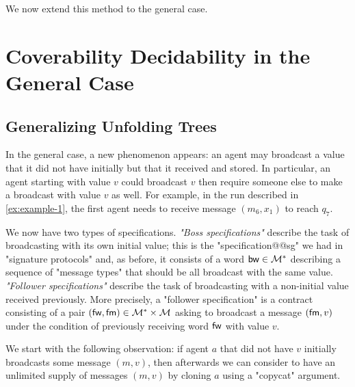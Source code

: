 We now extend this method to the general case. 


\section{Coverability Decidability in the General Case}
\label{sec:cover-general-case}

\subsection{Generalizing Unfolding Trees}
\label{sec:unfolding-trees-general}
In the general case, a new phenomenon appears: an agent may broadcast a value that it did not have initially but that it received and stored. In particular, an agent starting with value $v$ could broadcast $v$ then require someone else to make a broadcast with value $v$ as well. For example, in the run described in \cref{ex:example-1}, the first agent needs to receive message $(m_6, x_1)$ to reach $q_7$.

 We now have two types of specifications. \emph{"Boss specifications"} describe the task of broadcasting with its own initial value; this is the "specification@@sg" we had in "signature protocols" and, as before, it consists of a word $\mathsf{bw} \in \mathcal{M}^\ast$ describing a sequence of "message types" that should be all broadcast with the same value. \emph{"Follower specifications"} describe the task of broadcasting with a non-initial value received previously. More precisely, a "follower specification" is a contract consisting of a pair $(\mathsf{fw}, \mathsf{fm}) \in \mathcal{M}^*\times \mathcal{M}$ asking to broadcast a message $(\mathsf{fm},v)$ under the condition of previously receiving word $\mathsf{fw}$ with value $v$.


We start with the following observation: if agent $a$ that did not have $v$ initially broadcasts some message $(m,v)$, then afterwards we can consider to have an unlimited supply of messages $(m,v)$ by cloning $a$ using a "copycat" argument. 

